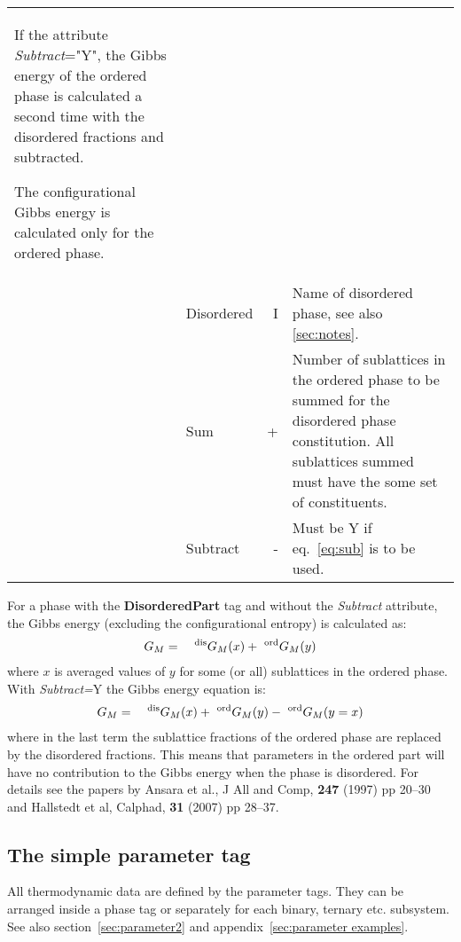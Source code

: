 \documentclass{article}
\begin{document}
\begin{tabular}{|p{} p{} r p{}|}
              If the attribute {\em Subtract}="Y", the Gibbs energy of
              the ordered phase is calculated a second time with the
              disordered fractions and subtracted.  

              The configurational Gibbs energy is calculated only for
              the ordered phase.\\

        & Disordered & I & Name of disordered phase, 
              see also \ref{sec:notes}.\\
        & Sum & + & Number of sublattices in the ordered phase to be 
               summed for the disordered phase constitution.  All sublattices
               summed must have the some set of constituents.\\
        & Subtract & - & Must be Y if eq.~\ref{eq:sub} is to be used.\\\hline

\end{tabular}

\bigskip
For a phase with the {\bf DisorderedPart} tag and without the {\em
  Subtract} attribute, the Gibbs energy (excluding the configurational
entropy) is calculated as:
\begin{eqnarray}
G_M &=& ~^{\rm dis}G_M(x) + ~^{\rm ord}G_M(y) \label{eq:nosub}
\end{eqnarray}
where $x$ is averaged values of $y$ for some (or all) sublattices in the
ordered phase.   With {\em Subtract=}Y the Gibbs energy equation is:
\begin{eqnarray}
G_M &=& ~^{\rm dis}G_M(x) + ~^{\rm ord}G_M(y) - ~^{\rm ord}G_M(y=x) \label{eq:sub}
\end{eqnarray}
where in the last term the sublattice fractions of the ordered phase
are replaced by the disordered fractions.  This means that parameters
in the ordered part will have no contribution to the Gibbs energy when
the phase is disordered.  For details see the papers by Ansara et al.,
J All and Comp, {\bf 247} (1997) pp 20--30 and Hallstedt et al,
Calphad, {\bf 31} (2007) pp 28--37.

\newpage 

\subsection{The simple parameter tag}

All thermodynamic data are defined by the parameter tags.  They
can be arranged inside a phase tag or separately for each binary,
ternary etc. subsystem.  See also section~\ref{sec:parameter2} and
  appendix~\ref{sec:parameter examples}.
\end{document}
